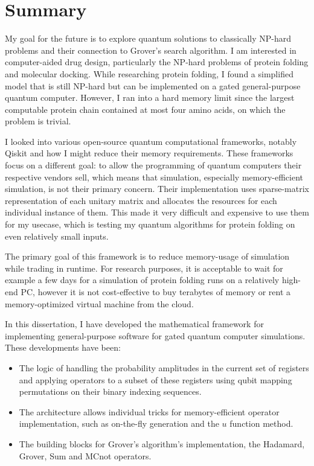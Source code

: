 \chapter{Summary}

My goal for the future is to explore quantum solutions to classically NP-hard problems and their connection to Grover's search algorithm. I am interested in computer-aided drug design, particularly the NP-hard problems of protein folding and molecular docking. While researching protein folding, I found a simplified model that is still NP-hard but can be implemented on a gated general-purpose quantum computer. However, I ran into a hard memory limit since the largest computable protein chain contained at most four amino acids, on which the problem is trivial.

I looked into various open-source quantum computational frameworks, notably Qiskit and how I might reduce their memory requirements. These frameworks focus on a different goal: to allow the programming of quantum computers their respective vendors sell, which means that simulation, especially memory-efficient simulation, is not their primary concern. Their implementation uses sparse-matrix representation of each unitary matrix and allocates the resources for each individual instance of them. This made it very difficult and expensive to use them for my usecase, which is testing my quantum algorithms for protein folding on even relatively small inputs.

The primary goal of this framework is to reduce memory-usage of simulation while trading in runtime. For research purposes, it is acceptable to wait for example a few days for a simulation of protein folding runs on a relatively high-end PC, however it is not cost-effective to buy terabytes of memory or rent a memory-optimized virtual machine from the cloud.

In this dissertation, I have developed the mathematical framework for implementing general-purpose software for gated quantum computer simulations. These developments have been:

\begin{itemize}
    \item The logic of handling the probability amplitudes in the current set of registers and applying operators to a subset of these registers using qubit mapping permutations on their binary indexing sequences.
    \item The architecture allows individual tricks for memory-efficient operator implementation, such as on-the-fly generation and the $u$ function method.
    \item The building blocks for Grover's algorithm's implementation, the Hadamard, Grover, Sum and MCnot operators.
\end{itemize}

